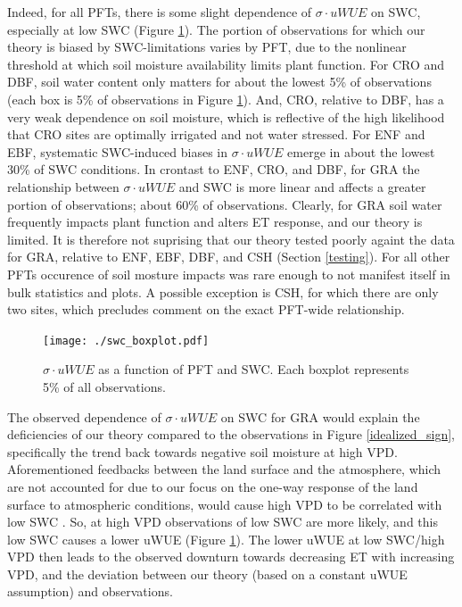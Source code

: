 \documentclass[draft,linenumbers]{gcbjournal}
\begin{document}
Indeed, for all PFTs, there is some slight dependence of $\sigma \cdot uWUE$ on SWC, especially at low SWC (Figure \ref{swc_boxplot}). The portion of observations for which our theory is biased by SWC-limitations varies by PFT, due to the nonlinear threshold at which soil moisture availability limits plant function. For CRO and DBF, soil water content only matters for about the lowest 5\% of observations (each box is 5\% of observations in Figure \ref{swc_boxplot}). And, CRO, relative to DBF, has a very weak dependence on soil moisture, which is reflective of the high likelihood that CRO sites are optimally irrigated and not water stressed. For ENF and EBF, systematic SWC-induced biases in $\sigma \cdot uWUE$ emerge in about the lowest 30\% of SWC conditions. In crontast to ENF, CRO, and DBF, for GRA the relationship between $\sigma \cdot uWUE$ and SWC is more linear and affects a greater portion of observations; about 60\% of observations. Clearly, for GRA soil water frequently impacts plant function and alters ET response, and our theory is limited. It is therefore not suprising that our theory tested poorly againt the data for GRA, relative to ENF, EBF, DBF, and CSH (Section \ref{testing}). For all other PFTs occurence of soil mosture impacts was rare enough to not manifest itself in bulk statistics and plots. A possible exception is CSH, for which there are only two sites, which precludes comment on the exact PFT-wide relationship.

\begin{figure}
\centering
\texttt{[image: ./swc\_boxplot.pdf]}
\caption{$\sigma \cdot uWUE$ as a function of PFT and SWC. Each boxplot represents 5\% of all observations.}
\label{swc_boxplot}
\end{figure}

The observed dependence of $\sigma \cdot uWUE$ on SWC for GRA would explain the deficiencies of our theory compared to the observations in Figure \ref{idealized_sign}, specifically the trend back towards negative soil moisture at high VPD. Aforementioned feedbacks between the land surface and the atmosphere, which are not accounted for due to our focus on the one-way response of the land surface to atmospheric conditions, would cause high VPD to be correlated with low SWC \citep[][]{Gentine_2016, Berg_2016}. So, at high VPD observations of low SWC are more likely, and this low SWC causes a lower uWUE (Figure \ref{swc_boxplot}). The lower uWUE at low SWC/high VPD then leads to the observed downturn towards decreasing ET with increasing VPD, and the deviation between our theory (based on a constant uWUE assumption) and observations.
\end{document}
